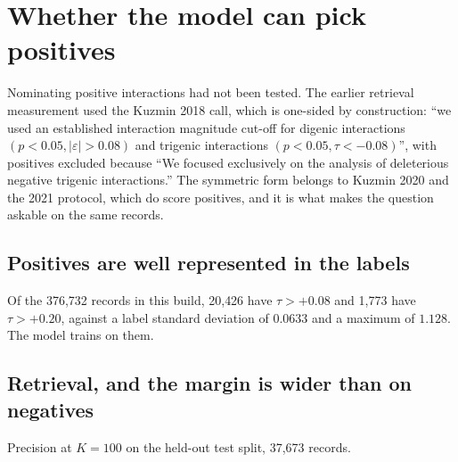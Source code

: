 \section{Whether the model can pick positives}\label{sec:positives}

Nominating positive interactions had not been tested. The earlier retrieval
measurement used the Kuzmin 2018 call, which is one-sided by construction:
``we used an established interaction magnitude cut-off for digenic interactions
$(p < 0.05, |\varepsilon| > 0.08)$ and trigenic interactions
$(p < 0.05, \tau < -0.08)$'', with positives excluded because
``We focused exclusively on the analysis of deleterious negative trigenic
interactions.'' The symmetric form belongs to Kuzmin 2020 and the 2021 protocol,
which do score positives, and it is what makes the question askable on the same
records.

\subsection{Positives are well represented in the labels}

Of the 376{,}732 records in this build, 20{,}426 have $\tau > +0.08$ and 1{,}773
have $\tau > +0.20$, against a label standard deviation of $0.0633$ and a maximum
of $1.128$. The model trains on them.

\subsection{Retrieval, and the margin is wider than on negatives}

Precision at $K = 100$ on the held-out test split, 37{,}673 records.

